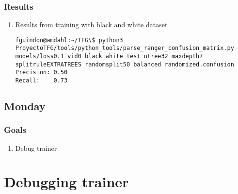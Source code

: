 \documentclass[12pt,oneside]{book}
\begin{document}
\subsubsection{Results}
\begin{enumerate}
  \item Results from training with black and white dataset
\begin{lstlisting}
fguindon@amdahl:~/TFG\$ python3 ProyectoTFG/tools/python_tools/parse_ranger_confusion_matrix.py models/loss0.1 vid0 black white test ntree32 maxdepth7 splitruleEXTRATREES randomsplit50 balanced randomized.confusion 
Precision: 0.50
Recall:    0.73
\end{lstlisting}
\end{enumerate}

\subsection*{Monday}

\subsubsection{Goals}
\begin{enumerate}
  \item Debug trainer
\end{enumerate}

\section{Debugging trainer}
\end{document}
